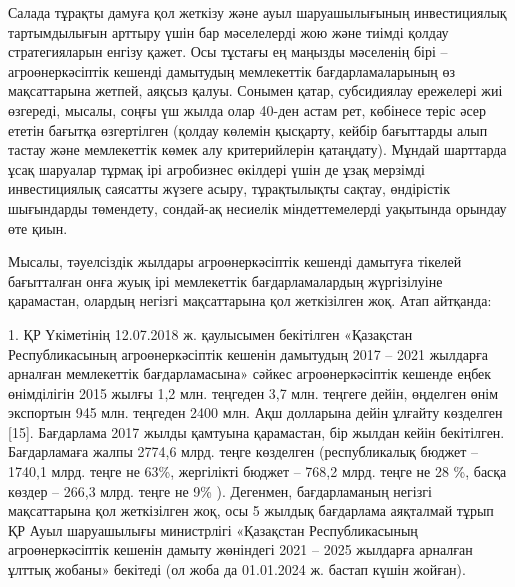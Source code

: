 {{%

Салада тұрақты дамуға қол жеткізу және ауыл шаруашылығының инвестициялық
тартымдылығын арттыру үшін бар мәселелерді жою және тиімді қолдау
стратегияларын енгізу қажет. Осы тұстағы ең маңызды мәселенің бірі --
агроөнеркәсіптік кешенді дамытудың мемлекеттік бағдарламаларының өз
мақсаттарына жетпей, аяқсыз қалуы. Сонымен қатар, субсидиялау ережелері
жиі өзгереді, мысалы, соңғы үш жылда олар 40-ден астам рет, көбінесе
теріс әсер ететін бағытқа өзгертілген (қолдау көлемін қысқарту, кейбір
бағыттарды алып тастау және мемлекеттік көмек алу критерийлерін
қатаңдату). Мұндай шарттарда ұсақ шаруалар тұрмақ ірі агробизнес
өкілдері үшін де ұзақ мерзімді инвестициялық саясатты жүзеге асыру,
тұрақтылықты сақтау, өндірістік шығындарды төмендету, сондай-ақ несиелік
міндеттемелерді уақытында орындау өте қиын.

Мысалы, тәуелсіздік жылдары агроөнеркәсіптік кешенді дамытуға тікелей
бағытталған онға жуық ірі мемлекеттік бағдарламалардың жүргізілуіне
қарамастан, олардың негізгі мақсаттарына қол жеткізілген жоқ. Атап
айтқанда:

1. ҚР Үкіметінің 12.07.2018 ж. қаулысымен бекітілген «Қазақстан
Республикасының агроөнеркәсіптік кешенін дамытудың 2017 -- 2021 жылдарға
арналған мемлекеттік бағдарламасына» сәйкес агроөнеркәсіптік кешенде
еңбек өнімділігін 2015 жылғы 1,2 млн. теңгеден 3,7 млн. теңгеге дейін,
өңделген өнім экспортын 945 млн. теңгеден 2400 млн. Ақш долларына дейін
ұлғайту көзделген {[}15{]}. Бағдарлама 2017 жылды қамтуына қарамастан,
бір жылдан кейін бекітілген. Бағдарламаға жалпы 2774,6 млрд. теңге
көзделген (республикалық бюджет -- 1740,1 млрд. теңге не 63\%,
жергілікті бюджет -- 768,2 млрд. теңге не 28 \%, басқа көздер -- 266,3
млрд. теңге не 9\% ). Дегенмен, бағдарламаның негізгі мақсаттарына қол
жеткізілген жоқ, осы 5 жылдық бағдарлама аяқталмай тұрып ҚР Ауыл
шаруашылығы министрлігі «Қазақстан Республикасының агроөнеркәсіптік
кешенін дамыту жөніндегі 2021 -- 2025 жылдарға арналған ұлттық жобаны»
бекітеді (ол жоба да 01.01.2024 ж. бастап күшін жойған).

}}
